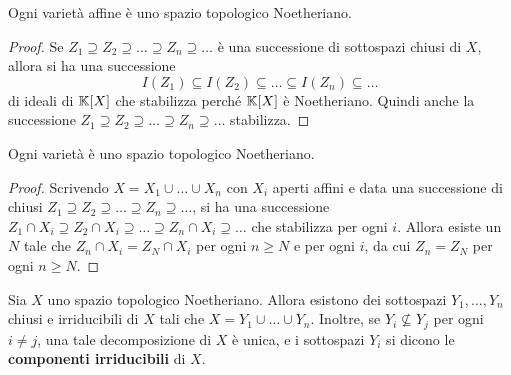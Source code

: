 \begin{remark}
    Ogni varietà affine è uno spazio topologico Noetheriano.
\end{remark}
\begin{proof}
    Se $Z_1\supseteq Z_2 \supseteq \ldots \supseteq Z_n \supseteq\ldots$ è una successione di sottospazi chiusi di $X$, allora si ha una successione  \[I(Z_1)\subseteq I(Z_2) \subseteq \ldots \subseteq I(Z_n)\subseteq \ldots\]  di ideali di $\mathbb{K}[X]$ che stabilizza perché $\mathbb{K}[X]$ è Noetheriano. Quindi anche la successione $Z_1\supseteq Z_2 \supseteq \ldots \supseteq Z_n \supseteq\ldots$ stabilizza.
\end{proof}

\begin{remark}
    Ogni varietà è uno spazio topologico Noetheriano.
\end{remark}
\begin{proof}
Scrivendo $X=X_1\cup\ldots\cup X_n$ con $X_i$ aperti affini e data una successione di chiusi $Z_1\supseteq Z_2 \supseteq \ldots \supseteq Z_n \supseteq\ldots$, si ha una successione $Z_1\cap X_i\supseteq Z_2 \cap X_i\supseteq \ldots \supseteq Z_n  \cap X_i\supseteq\ldots$  che stabilizza per ogni $i$. Allora esiste un $N$ tale che $Z_n\cap X_i= Z_N \cap X_i$ per ogni $n\ge N$ e per ogni $i$, da cui $Z_n=Z_N$ per ogni $n\ge N$.
\end{proof}

\begin{proposition}
    Sia $X$ uno spazio topologico Noetheriano. Allora esistono dei sottospazi $Y_1,\ldots,Y_n$ chiusi e irriducibili di $X$ tali che $X=Y_1\cup\ldots\cup Y_n$. Inoltre, se $Y_i\not\subseteq Y_j$ per ogni $i\ne j$, una tale decomposizione di $X$ è unica, e i sottospazi $Y_i$ si dicono le \textbf{componenti irriducibili} di $X$.
\end{proposition}

